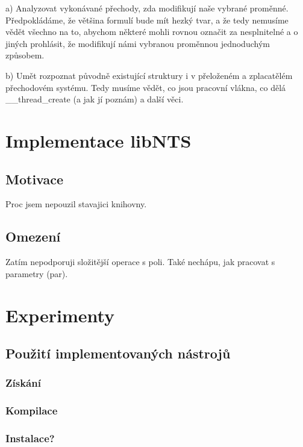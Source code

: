 \documentclass[10pt,a4paper,notitlepage]{report}
\begin{document}
a) Analyzovat vykonávané přechody, zda modifikují naše vybrané proměnné. Předpokládáme, že většina formulí bude mít hezký tvar, a že tedy nemusíme vědět všechno na to, abychom některé mohli rovnou označit za nesplnitelné a o jiných prohlásit, že modifikují námi vybranou proměnnou jednoduchým způsobem.

b) Umět rozpoznat původně existující struktury i v přeloženém a zplacatělém přechodovém systému. Tedy musíme vědět, co jsou pracovní vlákna, co dělá \_\_thread\_create (a jak jí poznám) a další věci.


\chapter{Implementace libNTS}
\section{Motivace}
Proc jsem nepouzil stavajici knihovny.
\section{Omezení}
Zatím nepodporuji složitější operace s poli. Také nechápu, jak pracovat s parametry (par).


\chapter{Experimenty}
\section{Použití implementovaných nástrojů}
\subsection{Získání}
\subsection{Kompilace}
\subsection{Instalace?}
\end{document}
